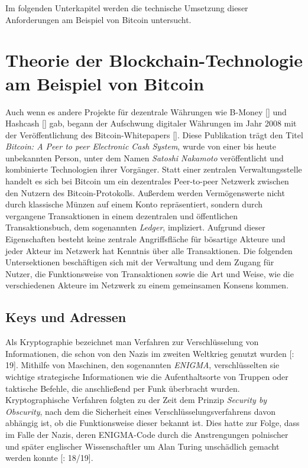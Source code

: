 Im folgenden Unterkapitel werden die technische Umsetzung dieser Anforderungen am Beispiel von Bitcoin untersucht.
\section{Theorie der Blockchain-Technologie am Beispiel von Bitcoin}
Auch wenn es andere Projekte für dezentrale Währungen wie B-Money [\cite{dai_1998}] und Hashcash [\cite{back_2002}] gab, begann der Aufschwung digitaler Währungen im Jahr 2008 mit der Veröffentlichung des Bitcoin-Whitepapers  [\cite{nakamoto_whitepaper_2008}]. Diese Publikation trägt den Titel \emph{Bitcoin: A Peer to peer Electronic Cash System}, wurde von einer bis heute unbekannten Person, unter dem Namen \emph{Satoshi Nakamoto} veröffentlicht und kombinierte Technologien ihrer Vorgänger. Statt einer zentralen Verwaltungsstelle handelt es sich bei Bitcoin um ein dezentrales Peer-to-peer Netzwerk zwischen den Nutzern des Bitcoin-Protokolls. Außerdem werden Vermögenswerte nicht durch klassische Münzen auf einem Konto repräsentiert, sondern durch vergangene Transaktionen in einem dezentralen und öffentlichen Transaktionsbuch, dem sogenannten \emph{Ledger}, impliziert. Aufgrund dieser Eigenschaften besteht keine zentrale Angriffsfläche für bösartige Akteure und jeder Akteur im Netzwerk hat Kenntnis über alle Transaktionen. Die folgenden Untersektionen beschäftigen sich mit der Verwaltung und dem Zugang für Nutzer, die Funktionsweise von Transaktionen sowie die Art und Weise, wie die verschiedenen Akteure im Netzwerk zu einem gemeinsamen Konsens kommen.
\subsection{Keys und Adressen}
Als Kryptographie bezeichnet man Verfahren zur Verschlüsselung von Informationen, die schon von den Nazis im zweiten Weltkrieg genutzt wurden [\cite{landwehr_2008}: 19]. 
Mithilfe von Maschinen, den sogenannten \emph{ENIGMA}, verschlüsselten sie wichtige strategische Informationen wie die Aufenthaltsorte von Truppen oder taktische Befehle, die anschließend per Funk überbracht wurden.
Kryptographische Verfahren folgten zu der Zeit dem Prinzip \emph{Security by Obscurity}, nach dem die Sicherheit eines Verschlüsselungsverfahrens davon abhängig ist, ob die Funktionsweise dieser bekannt ist. 
Dies hatte zur Folge, dass im Falle der Nazis, deren ENIGMA-Code durch die Anstrengungen polnischer und später englischer Wissenschaftler um Alan Turing unschädlich gemacht werden konnte [\cite{landwehr_2008}: 18/19].\\

